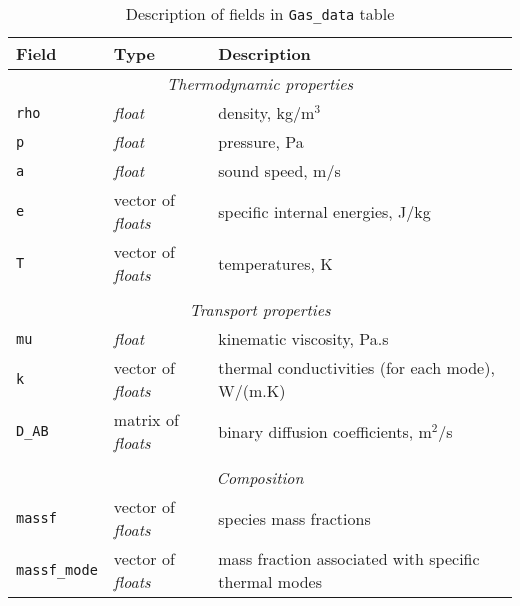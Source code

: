 \begin{table}
 \begin{center}
  \caption{Description of fields in \texttt{Gas\_data} table}
  \label{tab:gas-data}
\begin{tabular}{llp{6cm}}
 \hline \hline
 Field        & Type            &  Description \\ \hline
\multicolumn{3}{c}{\emph{Thermodynamic properties}} \\
\texttt{rho}  & \textit{float}  &  density, kg/m$^3$ \\
\texttt{p}    & \textit{float}  &  pressure, Pa \\
\texttt{a}    & \textit{float}  &  sound speed, m/s \\
\texttt{e}    & vector of \textit{floats} & specific internal energies, J/kg \\
\texttt{T}    & vector of \textit{floats} & temperatures, K \\
              &                           &                 \\
\multicolumn{3}{c}{\emph{Transport properties}} \\
\texttt{mu}   & \textit{float}  &  kinematic viscosity, Pa.s \\
\texttt{k}    & vector of \textit{floats} & thermal conductivities (for each mode), W/(m.K) \\
\texttt{D\_AB} & matrix of \textit{floats} & binary diffusion coefficients, m$^2$/s \\
              &                 &             \\
\multicolumn{3}{c}{\emph{Composition}} \\
\texttt{massf} & vector of \textit{floats} & species mass fractions \\
\texttt{massf\_mode} & vector of \textit{floats} & mass fraction associated with specific thermal modes \\ \hline
\end{tabular}
\end{center}
\end{table}

